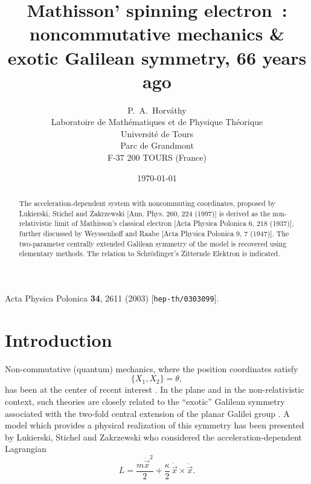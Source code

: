 \documentclass[a4paper,11pt]{article}
\let\ssection=\section
\renewcommand{\section}{\setcounter{equation}{0}\ssection}
\newcommand{\vx}{{\vec x}}
\def\vx{{\vec x}}
\begin{document}
\setlength{\baselineskip}{16pt}

\title{Mathisson' spinning electron~:
  noncommutative mechanics \& exotic Galilean symmetry,
  66 years ago\\[8pt]
}
\author{
P.~A.~Horv\'athy
\\
Laboratoire de Math\'ematiques et de Physique Th\'eorique\\
Universit\'e de Tours\\
Parc de Grandmont\\
F-37 200 TOURS (France)
}

\date{\today}

\maketitle


\begin{abstract}
     The acceleration-dependent system with noncommuting coordinates,
     proposed by Lukierski, Stichel and Zakrzewski [Ann. Phys. 260,
     224 (1997)]
     is derived as the non-relativistic limit of Mathisson's
     classical electron [Acta Physica Polonica 6, 218 (1937)],
     further discussed by Weyssenhoff and Raabe
     [Acta Physica Polonica 9, 7 (1947)].
     The two-parameter centrally extended Galilean symmetry of
     the model is recovered using elementary methods.
     The relation to Schr\"odinger's Zitternde Elektron
     is indicated.
\end{abstract}




\noindent
Acta Physica Polonica {\bf 34}, 2611 (2003)
[\texttt{hep-th/0303099}].


\section{Introduction}

Non-commutative (quantum) mechanics, where the position
coordinates satisfy
\begin{equation}
	\big\{X_{1}, X_{2}\big\}=\theta,
\label{NCpos}
\end{equation}
has been at the center of recent interest \cite{NCQM}.
In the plane and in the non-relativistic context,
such theories are closely related to the
``exotic'' Galilean symmetry associated with the
two-fold central extension of the planar Galilei
group \cite{exotic}.
A model which provides a physical realization
of this symmetry has been presented by Lukierski,
Stichel and Zakrzewski \cite{LSZ} who considered
the acceleration-dependent Lagrangian
\begin{equation}
     L=
     \frac{m\dot{\vx}^2}{2}
     +
     \frac{\kappa}{2}\,\dot{\vx}\times\ddot{\vx}.
     \label{LSZlag}
\end{equation}
\end{document}
